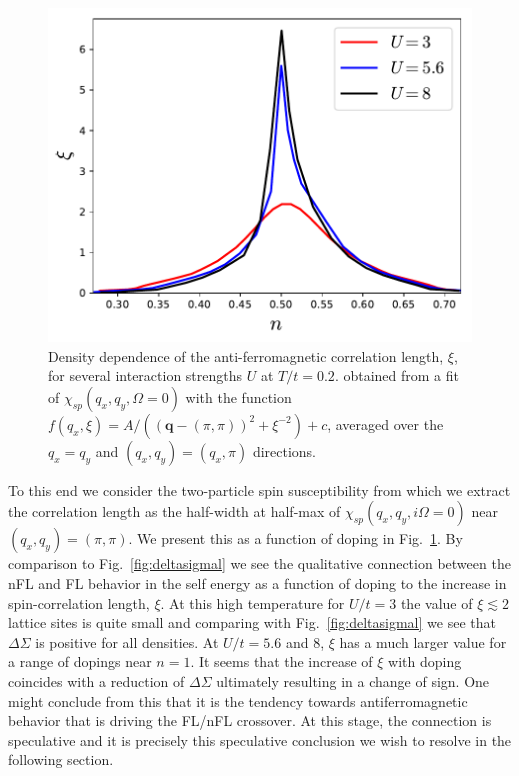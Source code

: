 \documentclass[twocolumn,notitlepage,prb,superscriptaddress,showpacs]{revtex4-1}
\begin{document}
\begin{figure}
\centering
    \includegraphics[width=0.9\linewidth]{density_cor.pdf}
        \caption{\label{fig:corlengthdoping}Density dependence of the anti-ferromagnetic correlation length, $\xi$, for several interaction strengths $U$ at $T/t=0.2$. obtained from a fit of $\chi_{sp}(q_x,q_y,\Omega=0)$ with the function $f(q_x,\xi)=A/((\mathbf{q}-(\pi,\pi))^2+\xi^{-2}) +c $, averaged over the $q_x=q_y$ and $(q_x,q_y)=(q_x,\pi)$ directions.\cite{rohringer:2016,gukelberger:2017}}
\end{figure}

To this end we consider the two-particle spin susceptibility\cite{hafermann:2008,chen:2017} from which we extract the correlation length as the half-width at half-max of $\chi_{sp}(q_x,q_y,i\Omega=0)$ near $(q_x,q_y)=(\pi,\pi)$.  We present this as a function of doping in Fig.~\ref{fig:corlengthdoping}.  By comparison to Fig.~\ref{fig:deltasigmal} we see the qualitative connection between the nFL and FL behavior in the self energy as a function of doping to the increase in spin-correlation length, $\xi$.  
At this high temperature for $U/t=3$ the value of $\xi \lesssim 2$ lattice sites is quite small and comparing with Fig.~\ref{fig:deltasigmal} we see that $\Delta \Sigma$ is positive for all densities.  At $U/t=5.6$ and 8, $\xi$ has a much larger value for a range of dopings near $n=1$.  It seems that the increase of $\xi$ with doping coincides with a reduction of $\Delta \Sigma$ ultimately resulting in a change of sign.
One might conclude from this that it is the tendency towards antiferromagnetic behavior that is driving the FL/nFL crossover.  At this stage, the connection is speculative and it is precisely this speculative conclusion we wish to resolve in the following section. 
\end{document}

